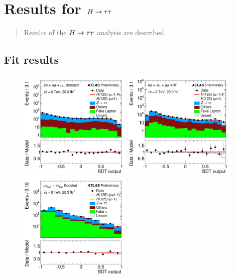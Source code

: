 \chapter[Results for $\Htautau$][Results for $\Htautau$]{Results for $\Htautau$}
\label{chap:results}

\begin{quote}
Results of the $\Htautau$ analysis are described.
\end{quote}

\section{Fit results}
\label{sec:results-fit-results}

\begin{figure}[tp]
  \centering
  \includegraphics[width=0.48\textwidth]{figures/ATLAS-CONF-2014-061/fig_08b}
  \includegraphics[width=0.48\textwidth]{figures/ATLAS-CONF-2014-061/fig_08a}
  \includegraphics[width=0.48\textwidth]{figures/ATLAS-CONF-2014-061/fig_08d}

\end{figure}
